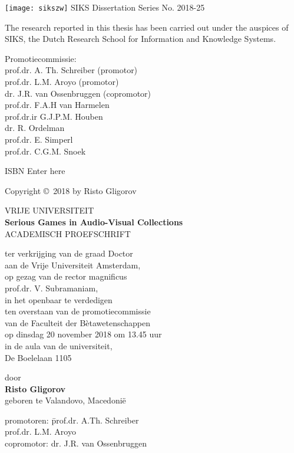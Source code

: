 \documentclass[a4paper,12pt]{book}
\author{Riste Gligorov}
\begin{document}
\frontmatter

\noindent
\texttt{[image: sikszw]}\hspace{1cm}
SIKS Dissertation Series No. 2018-25
\vspace{3mm}

\noindent
The research reported in this thesis has been carried out under the auspices of SIKS, the Dutch Research School for Information and Knowledge Systems.
\vspace{1.5cm}

\noindent
Promotiecommissie:\\
prof.dr. A. Th. Schreiber (promotor)\\
prof.dr. L.M. Aroyo (promotor)\\
dr. J.R. van Ossenbruggen (copromotor)\\
prof.dr. F.A.H van Harmelen\\
prof.dr.ir G.J.P.M. Houben \\
dr. R. Ordelman\\
prof.dr. E. Simperl\\
prof.dr. C.G.M. Snoek\\
\vfill

\noindent
ISBN Enter here

\noindent
Copyright \copyright ~2018 by Risto Gligorov


\begin{titlepage}
\pagestyle{empty}
\topmargin=0.48cm
\centering
VRIJE UNIVERSITEIT\\
\vspace{49pt}
\centering
{\bf Serious Games in Audio-Visual Collections}\\
\vspace{85pt}
\centering
ACADEMISCH PROEFSCHRIFT\\

\begin{center}
ter verkrijging van de graad Doctor\\
aan de Vrije Universiteit Amsterdam,\\
op gezag van de rector magnificus\\
prof.dr. V. Subramaniam,\\
in het openbaar te verdedigen\\
ten overstaan van de promotiecommissie\\
van de Faculteit der Bètawetenschappen\\
op dinsdag 20 november 2018 om 13.45 uur\\
in de aula van de universiteit,\\
De Boelelaan 1105
\end{center}
\vspace{99pt}
door\\
\bigskip
{\bf Risto Gligorov}\\
\bigskip
geboren te Valandovo, Macedoni\"{e}
\clearpage
\raggedright
\begin{tabbing}
promotoren: \= prof.dr. A.Th. Schreiber\\
\> prof.dr. L.M. Aroyo\\
copromotor: \> dr. J.R. van Ossenbruggen
\end{tabbing}
\end{titlepage}
\tableofcontents
\end{document}
